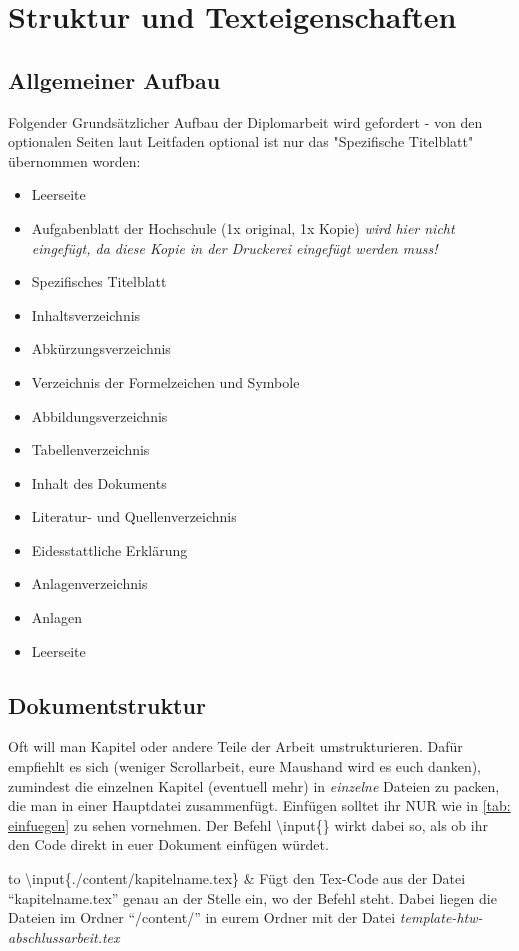 \chapter{Struktur und Texteigenschaften}%
\section{Allgemeiner Aufbau}%
Folgender Grundsätzlicher Aufbau der Diplomarbeit wird gefordert - von den optionalen Seiten laut Leitfaden optional ist nur das "Spezifische Titelblatt" übernommen worden:%
\begin{itemize}%
 \item Leerseite%
 \item Aufgabenblatt der Hochschule (1x original, 1x Kopie) \emph{wird hier nicht eingefügt, da diese Kopie in der Druckerei eingefügt werden muss!}%
 \item Spezifisches Titelblatt%
 \item Inhaltsverzeichnis%
 \item Abkürzungsverzeichnis%
 \item Verzeichnis der Formelzeichen und Symbole%
 \item Abbildungsverzeichnis%
 \item Tabellenverzeichnis%
 \item Inhalt des Dokuments%
 \item Literatur- und Quellenverzeichnis%
 \item Eidesstattliche Erklärung%
 \item Anlagenverzeichnis%
 \item Anlagen%
 \item Leerseite%
\end{itemize}%
%
%
%
\section{Dokumentstruktur}%
Oft will man Kapitel oder andere Teile der Arbeit umstrukturieren. Dafür empfiehlt es sich (weniger Scrollarbeit, eure Maushand wird es euch danken), zumindest die einzelnen Kapitel (eventuell mehr) in \emph{einzelne} Dateien zu packen, die man in einer Hauptdatei zusammenfügt. Einfügen solltet ihr \textsc{NUR} wie  in \ref{tab: einfuegen} zu sehen vornehmen. Der Befehl \textbackslash input\{\} wirkt dabei so, als ob ihr den Code direkt in euer Dokument einfügen würdet. %
\begin{table}[h]%
\begin{tabu} to \textwidth {X[l]X[l]}%
\toprule%
\textbackslash input\{./content/kapitelname.tex\} & Fügt den Tex-Code aus der Datei "`kapitelname.tex"' genau an der Stelle ein, wo der Befehl steht. Dabei liegen die Dateien im Ordner "`/content/"' in eurem Ordner mit der Datei \emph{template-htw-abschlussarbeit.tex}\\%
\bottomrule%
\end{tabu}%
\caption{Einfuegen}%
\label{tab: einfuegen}%
\end{table}%
%
%
